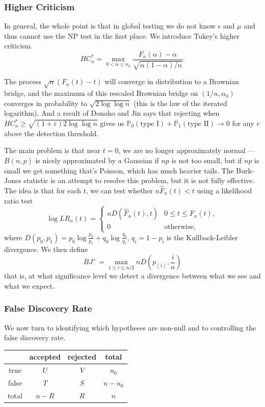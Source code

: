 \subsubsection{Higher Criticism}
In general, the whole point is that in global testing we do not know $\epsilon$ and $\mu$ and thus cannot use the NP test in the first place. We introduce Tukey’s higher criticism.
\[
HC_n^* = \max_{0 < \alpha \leq \alpha_0} \frac{F_n(\alpha) - \alpha}{\sqrt{\alpha(1 - \alpha)/n}}.
\]
\begin{rem}
    The process $\sqrt{n}(F_n(t) - t)$ will converge in distribution to a Brownian bridge, and the maximum of this rescaled Brownian bridge on $(1/n, \alpha_0)$ converges in probability to $\sqrt{2 \log \log n}$ (this is the law of the iterated logarithm). 
    And a result of Donoho and Jin says that rejecting when $HC_n^* \geq \sqrt{(1 + \varepsilon) 2 \log \log n}$ gives us $\mathbb{P}_0(\text{type I}) + \mathbb{P}_1(\text{type II}) \to 0$ for any $r$ above the detection threshold.
\end{rem}

\begin{rem}
    The main problem is that near $t = 0$, we are no longer approximately normal --- $B(n, p)$ is nicely approximated by a Gaussian if $np$ is not too small, but if $np$ is small we get something that's Poisson, which has much heavier tails. The Burk-Jones statistic is an attempt to resolve this problem, but it is not fully effective.
    The idea is that for each $t$, we can test whether $n\hat{F}_n(t) < t$ using a likelihood ratio test
    \[
    \log LR_n(t) = \begin{cases} nD(\hat{F}_n(t), t) & 0 \leq t \leq F_n(t), \\ 0 & \text{otherwise}, \end{cases}
    \]
    where $D(p_0, p_1) = p_0 \log \frac{p_0}{p_1} + q_0 \log \frac{q_0}{q_1}$, $q_i = 1 - p_i$ is the Kullback-Leibler divergence. We then define
    \[
    BJ^+ = \max_{1 \leq i \leq n/2} nD\left(p_{(i)}, \frac{i}{n}\right)
    \]
    that is, at what significance level we detect a divergence between what we see and what we expect.
\end{rem}

\subsubsection{False Discovery Rate}
We now turn to identifying which hypotheses are non-null and to controlling the false discovery rate.
\begin{table}[h]
\centering
\begin{tabular}{c|cc|c}
 & accepted & rejected & total \\
\hline
true  & $U$ & $V$ & $n_0$ \\
false & $T$ & $S$ & $n - n_0$ \\
\hline
total & $n - R$ & $R$ & $n$ \\
\end{tabular}
\end{table}

